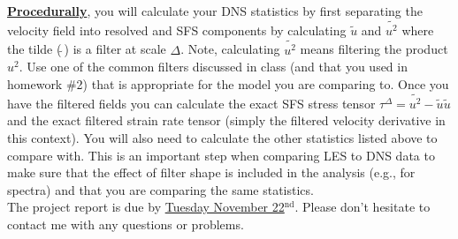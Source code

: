 \documentclass[11pt]{article}
\begin{document}
{\bf \underline{Procedurally}}, you will calculate your DNS statistics by first separating the velocity field into resolved and SFS components by calculating $\tilde{u}$ and $\widetilde{u^2}$ where
the tilde ($\tilde{~}$) is a filter at scale $\Delta$.  Note, calculating $\widetilde{u^2}$ means
filtering the product $u^2$.  Use one of the common filters discussed in class (and that you used in homework \#2) that is appropriate for the model you are comparing to.  Once you have the filtered fields you can calculate the exact SFS stress tensor $\tau^{\Delta}=\widetilde{u^2}-\tilde{u}\tilde{u}$ and the exact filtered strain rate tensor (simply the filtered velocity derivative in this context).  You will also need to calculate the other statistics listed above to compare with.  This is an important step when comparing LES to DNS data  to make sure that the effect of filter shape is included in the analysis (e.g., for spectra) and that you are comparing the same statistics.
\\

\noindent The project report is due by \underline{Tuesday November 22$^{\text{nd}}$}.  Please don't hesitate to contact me with any questions or problems.

\nocite{*}

\vspace*{24pt}

\end{document}
